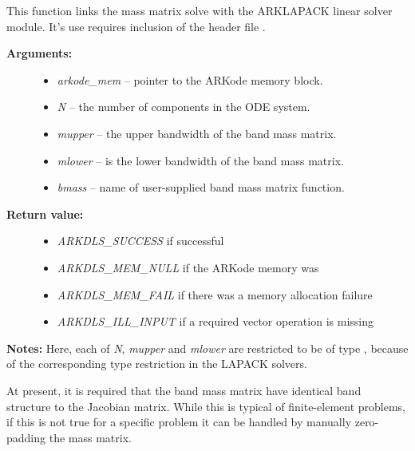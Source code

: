 \documentclass[letterpaper,10pt,english]{sphinxmanual}
\begin{document}

\begin{fulllineitems}
\label{c_interface/User_callable:ARKMassLapackBand}
This function links the mass matrix solve with the ARKLAPACK linear
solver module.  It's use requires inclusion of the header file
.
\begin{description}
\item[{\textbf{Arguments:}}] \leavevmode\begin{itemize}
\item {} 
\emph{arkode\_mem} -- pointer to the ARKode memory block.

\item {} 
\emph{N} -- the number of components in the ODE system.

\item {} 
\emph{mupper} -- the upper bandwidth of the band mass matrix.

\item {} 
\emph{mlower} -- is the lower bandwidth of the band mass matrix.

\item {} 
\emph{bmass} -- name of user-supplied band mass matrix function.

\end{itemize}

\item[{\textbf{Return value:}}] \leavevmode\begin{itemize}
\item {} 
\emph{ARKDLS\_SUCCESS}   if successful

\item {} 
\emph{ARKDLS\_MEM\_NULL}  if the ARKode memory was 

\item {} 
\emph{ARKDLS\_MEM\_FAIL}  if there was a memory allocation failure

\item {} 
\emph{ARKDLS\_ILL\_INPUT} if a required vector operation is missing

\end{itemize}

\end{description}

\textbf{Notes:} Here, each of \emph{N}, \emph{mupper} and \emph{mlower} are restricted
to be of type , because of the corresponding type restriction
in the LAPACK solvers.

At present, it is required that the band mass matrix have identical
band structure to the Jacobian matrix.  While this is typical of
finite-element problems, if this is not true for a specific problem
it can be handled by manually zero-padding the mass matrix.

\end{fulllineitems}
\end{document}
